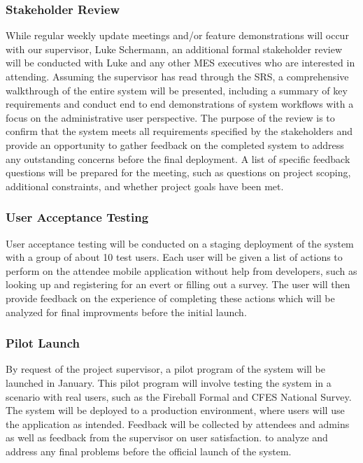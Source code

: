 \documentclass[12pt, titlepage]{article}
\begin{document}
\subsubsection{Stakeholder Review}
  While regular weekly update meetings and/or feature demonstrations will occur with our supervisor, Luke Schermann, an additional formal stakeholder review will be conducted with Luke and any other MES executives who are interested in attending. Assuming the supervisor has read through the SRS, a comprehensive walkthrough of the entire system will be presented, including a summary of key requirements and conduct end to end demonstrations of system workflows with a focus on the administrative user perspective. The purpose of the review is to confirm that the system meets all requirements specified by the stakeholders and provide an opportunity to gather feedback on the completed system to address any outstanding concerns before the final deployment. A list of specific feedback questions will be prepared for the meeting, such as questions on project scoping, additional constraints, and whether project goals have been met.

  \subsubsection{User Acceptance Testing}
  User acceptance testing will be conducted on a staging deployment of the system with a group of about 10 test users. Each user will be given a list of actions to perform on the attendee mobile application without help from developers, such as looking up and registering for an evert or filling out a survey. The user will then provide feedback on the experience of completing these actions which will be analyzed for final improvments before the initial launch.

\subsubsection{Pilot Launch}
  By request of the project supervisor, a pilot program of the system will be launched in January. This pilot program will involve testing the system in a scenario with real users, such as the Fireball Formal and CFES National Survey. The system will be deployed to a production environment, where users will use the application as intended. Feedback will be collected by attendees and admins as well as feedback from the supervisor on user satisfaction. to analyze and address any final problems before the official launch of the system.
\end{document}

